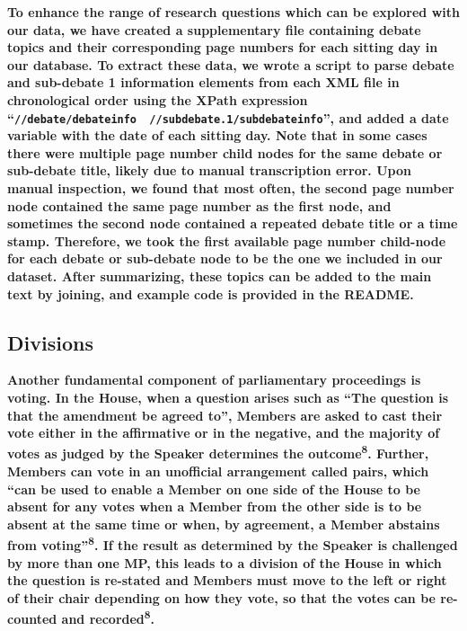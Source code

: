 \documentclass[
  letterpaper,
  DIV=11,
  numbers=noendperiod]{scrartcl}
\begin{document}
\textbf{To enhance the range of research questions which can be explored
with our data, we have created a supplementary file containing debate
topics and their corresponding page numbers for each sitting day in our
database. To extract these data, we wrote a script to parse debate and
sub-debate 1 information elements from each XML file in chronological
order using the XPath expression
``\texttt{//debate/debateinfo\ \textbar{}\ //subdebate.1/subdebateinfo}'',
and added a date variable with the date of each sitting day. Note that
in some cases there were multiple page number child nodes for the same
debate or sub-debate title, likely due to manual transcription error.
Upon manual inspection, we found that most often, the second page number
node contained the same page number as the first node, and sometimes the
second node contained a repeated debate title or a time stamp.
Therefore, we took the first available page number child-node for each
debate or sub-debate node to be the one we included in our dataset.
After summarizing, these topics can be added to the main text by
joining, and example code is provided in the README.}

\hypertarget{divisions}{%
\subsection{Divisions}\label{divisions}}

\textbf{Another fundamental component of parliamentary proceedings is
voting. In the House, when a question arises such as ``The question is
that the amendment be agreed to'', Members are asked to cast their vote
either in the affirmative or in the negative, and the majority of votes
as judged by the Speaker determines the outcome\textsuperscript{8}.
Further, Members can vote in an unofficial arrangement called pairs,
which ``can be used to enable a Member on one side of the House to be
absent for any votes when a Member from the other side is to be absent
at the same time or when, by agreement, a Member abstains from
voting''\textsuperscript{8}. If the result as determined by the Speaker
is challenged by more than one MP, this leads to a division of the House
in which the question is re-stated and Members must move to the left or
right of their chair depending on how they vote, so that the votes can
be re-counted and recorded\textsuperscript{8}.}
\end{document}
